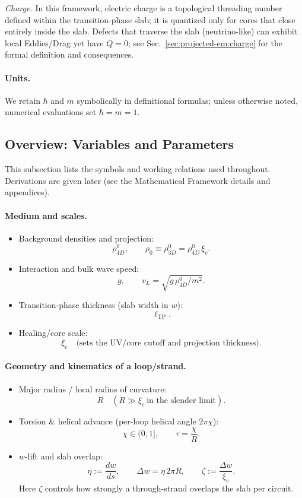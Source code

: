 \emph{Charge.} In this framework, electric charge is a topological threading number defined within the transition-phase slab; it is quantized only for cores that close entirely inside the slab. Defects that traverse the slab (neutrino-like) can exhibit local Eddies/Drag yet have $Q=0$; see Sec.~\ref{sec:projected-em:charge} for the formal definition and consequences.

\paragraph{Units.}
We retain $\hbar$ and $m$ symbolically in definitional formulas; unless otherwise noted, numerical evaluations set $\hbar=m=1$.

\medskip

\subsection{Overview: Variables and Parameters}

This subsection lists the symbols and working relations used throughout. Derivations are given later (see the Mathematical Framework details and appendices).

\paragraph{Medium and scales.}
\begin{itemize}
  \item Background densities and projection:
  \[
  \rho_{4D}^0,\qquad \rho_0\equiv \rho_{3D}^0=\rho_{4D}^0\,\xi_c.
  \]
  \item Interaction and bulk wave speed:
  \[
  g,\qquad v_L=\sqrt{g\,\rho_{4D}^0/m^{2}}.
  \]
  \item Transition-phase thickness (slab width in $w$):
  \[
  \ell_{\mathrm{TP}}.
  \]
  \item Healing/core scale:
  \[
  \xi_c \quad \text{(sets the UV/core cutoff and projection thickness)}.
  \]
\end{itemize}

\paragraph{Geometry and kinematics of a loop/strand.}
\begin{itemize}
  \item Major radius / local radius of curvature:
  \[
  R\quad (R\gg \xi_c\ \text{in the slender limit}).
  \]
  \item Torsion \& helical advance (per-loop helical angle $2\pi\chi$):
  \[
  \chi\in(0,1],\qquad \tau=\frac{\chi}{R}.
  \]
  \item $w$-lift and slab overlap:
  \[
  \eta:=\frac{dw}{ds},\qquad \Delta w= \eta\,2\pi R,\qquad
  \zeta:=\frac{\Delta w}{\xi_c}.
  \]
  Here $\zeta$ controls how strongly a through-strand overlaps the slab per circuit.
\end{itemize}

